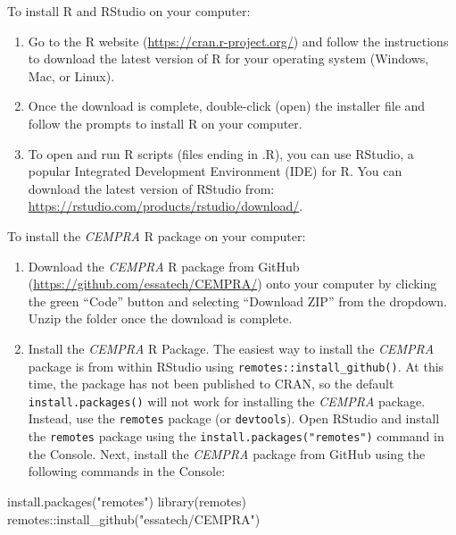 \documentclass[
  letterpaper,
  DIV=11,
  numbers=noendperiod]{scrreprt}
\newenvironment{Shaded}{\begin{snugshade}}{\end{snugshade}}
\newcommand{\FunctionTok}[1]{\textcolor[rgb]{0.28,0.35,0.67}{#1}}
\newcommand{\NormalTok}[1]{\textcolor[rgb]{0.00,0.23,0.31}{#1}}
\newcommand{\SpecialCharTok}[1]{\textcolor[rgb]{0.37,0.37,0.37}{#1}}
\newcommand{\StringTok}[1]{\textcolor[rgb]{0.13,0.47,0.30}{#1}}
\providecommand{\tightlist}{%
  \setlength{\itemsep}{0pt}\setlength{\parskip}{0pt}}\usepackage{longtable,booktabs,array}
\begin{document}
To install R and RStudio on your computer:

\begin{enumerate}
\def\labelenumi{\arabic{enumi}.}
\tightlist
\item
  Go to the R website (\url{https://cran.r-project.org/}) and follow the
  instructions to download the latest version of R for your operating
  system (Windows, Mac, or Linux).
\item
  Once the download is complete, double-click (open) the installer file
  and follow the prompts to install R on your computer.
\item
  To open and run R scripts (files ending in .R), you can use RStudio, a
  popular Integrated Development Environment (IDE) for R. You can
  download the latest version of RStudio from:
  \url{https://rstudio.com/products/rstudio/download/}.
\end{enumerate}

To install the \emph{CEMPRA} R package on your computer:

\begin{enumerate}
\def\labelenumi{\arabic{enumi}.}
\tightlist
\item
  Download the \emph{CEMPRA} R package from GitHub
  (\url{https://github.com/essatech/CEMPRA/}) onto your computer by
  clicking the green ``Code'' button and selecting ``Download ZIP'' from
  the dropdown. Unzip the folder once the download is complete.
\item
  Install the \emph{CEMPRA} R Package. The easiest way to install the
  \emph{CEMPRA} package is from within RStudio using
  \texttt{remotes::install\_github()}. At this time, the package has not
  been published to CRAN, so the default \texttt{install.packages()}
  will not work for installing the \emph{CEMPRA} package. Instead, use
  the \texttt{remotes} package (or \texttt{devtools}). Open RStudio and
  install the \texttt{remotes} package using the
  \texttt{install.packages("remotes")} command in the Console. Next,
  install the \emph{CEMPRA} package from GitHub using the following
  commands in the Console:
\end{enumerate}

\begin{Shaded}
\begin{Highlighting}[]
\FunctionTok{install.packages}\NormalTok{(}\StringTok{"remotes"}\NormalTok{)}
\FunctionTok{library}\NormalTok{(remotes)}
\NormalTok{remotes}\SpecialCharTok{::}\FunctionTok{install\_github}\NormalTok{(}\StringTok{"essatech/CEMPRA"}\NormalTok{)}
\end{Highlighting}
\end{Shaded}
\end{document}
